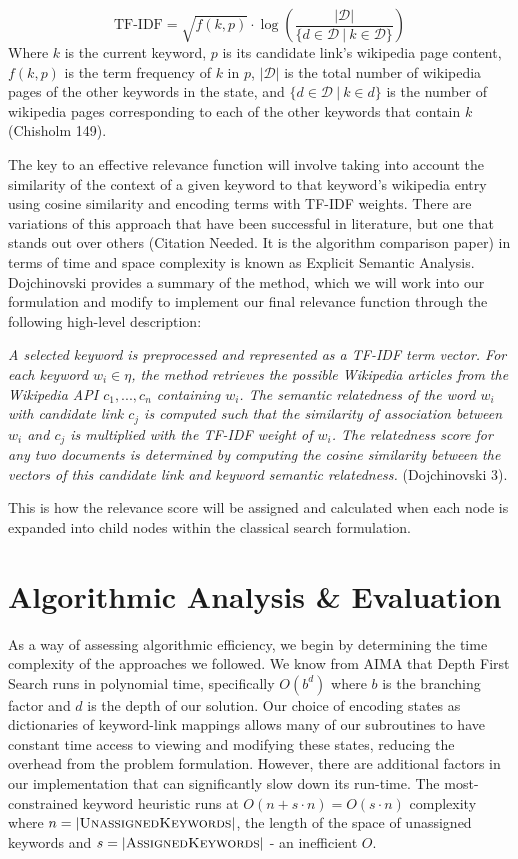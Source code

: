 \documentclass[twoside,11pt]{article}
\begin{document}
$$\mbox{TF-IDF} = \sqrt{f(k, p)} \cdot \log \left( \frac{|\mathcal{D}|}{\{d \in \mathcal{D} \ | \ k \in \mathcal{D}\}} \right) $$
Where $k$ is the current keyword, $p$ is its candidate link's wikipedia page content, $f(k,p)$ is the term frequency of $k$ in $p$, $|\mathcal{D}|$ is the total number of wikipedia pages of the other keywords in the state, and $\{d \in \mathcal{D} \ | \ k \in d\}$ is the number of wikipedia pages corresponding to each of the other keywords that contain $k$ (Chisholm 149).

The key to an effective relevance function will involve taking into account the similarity of the context of a given keyword to that keyword’s wikipedia entry using cosine similarity and encoding terms with TF-IDF weights. There are variations of this approach that have been successful in literature, but one that stands out over others (Citation Needed. It is the algorithm comparison paper) in terms of time and space complexity is known as Explicit Semantic Analysis. Dojchinovski provides a summary of the method, which we will work into our formulation and modify to implement our final relevance function through the following high-level description:

\textit{A selected keyword is preprocessed and represented as a TF-IDF term vector. For each keyword $w_i \in \eta$, the method retrieves the possible Wikipedia articles from the Wikipedia API $c_1,... ,c_n$ containing $w_i$. The semantic relatedness of the word $w_i$ with candidate link $c_j$ is computed such that the similarity of association between $w_i$ and $c_j$ is multiplied with the TF-IDF weight of $w_i$. The relatedness score for any two documents is determined by computing the cosine similarity between the vectors of this candidate link and keyword semantic relatedness.} (Dojchinovski 3).

This is how the relevance score will be assigned and calculated when each node is expanded into child nodes within the classical search formulation.

\section{Algorithmic Analysis \& Evaluation}
As a way of assessing algorithmic efficiency, we begin by determining the time complexity of the approaches we followed. We know from AIMA that Depth First Search runs in polynomial time, specifically $O(b^d)$ where $b$ is the branching factor and $d$ is the depth of our solution. Our  choice of encoding states as dictionaries of keyword-link mappings allows many of our subroutines to have constant time access to viewing and modifying these states, reducing the overhead from the problem formulation. However, there are additional factors in our implementation that can significantly slow down its run-time. The most-constrained keyword heuristic runs at $O(n + s\cdot n) = O(s\cdot n)$ complexity where $n = |\mbox{{\sc UnassignedKeywords}}|$, the length of the space of unassigned keywords and $s = |\mbox{{\sc AssignedKeywords}}|$ - an inefficient $O$.
\end{document}
